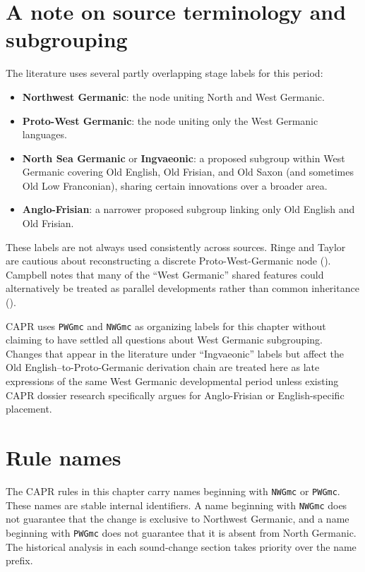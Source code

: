 \documentclass[
  british,
  a4paper,
  openany]{book}
\providecommand{\tightlist}{%
  \setlength{\itemsep}{0pt}\setlength{\parskip}{0pt}}
\begin{document}
\section{A note on source terminology and
subgrouping}\label{a-note-on-source-terminology-and-subgrouping}

The literature uses several partly overlapping stage labels for this
period:

\begin{itemize}
\tightlist
\item
  \textbf{Northwest Germanic}: the node uniting North and West Germanic.
\item
  \textbf{Proto-West Germanic}: the node uniting only the West Germanic
  languages.
\item
  \textbf{North Sea Germanic} or \textbf{Ingvaeonic}: a proposed
  subgroup within West Germanic covering Old English, Old Frisian, and
  Old Saxon (and sometimes Old Low Franconian), sharing certain
  innovations over a broader area.
\item
  \textbf{Anglo-Frisian}: a narrower proposed subgroup linking only Old
  English and Old Frisian.
\end{itemize}

These labels are not always used consistently across sources. Ringe and
Taylor are cautious about reconstructing a discrete Proto-West-Germanic
node ().
Campbell notes that many of the ``West Germanic'' shared features could
alternatively be treated as parallel developments rather than common
inheritance ().

CAPR uses \texttt{PWGmc} and \texttt{NWGmc} as organizing labels for
this chapter without claiming to have settled all questions about West
Germanic subgrouping. Changes that appear in the literature under
``Ingvaeonic'' labels but affect the Old English--to-Proto-Germanic
derivation chain are treated here as late expressions of the same West
Germanic developmental period unless existing CAPR dossier research
specifically argues for Anglo-Frisian or English-specific placement.

\section{Rule names}\label{rule-names}

The CAPR rules in this chapter carry names beginning with \texttt{NWGmc}
or \texttt{PWGmc}. These names are stable internal identifiers. A name
beginning with \texttt{NWGmc} does not guarantee that the change is
exclusive to Northwest Germanic, and a name beginning with
\texttt{PWGmc} does not guarantee that it is absent from North Germanic.
The historical analysis in each sound-change section takes priority over
the name prefix.
\end{document}
